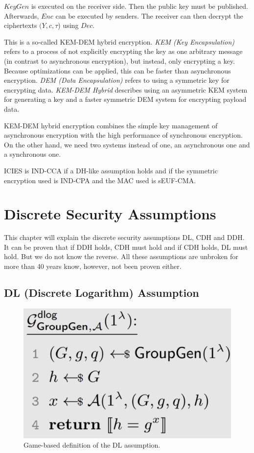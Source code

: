 $KeyGen$ is executed on the receiver side.
Then the public key must be published.
Afterwards, $Enc$ can be executed by senders.
The receiver can then decrypt the ciphertexts $(Y, c, \tau$) using $Dec$.

This is a so-called KEM-DEM hybrid encryption.
\textit{KEM (Key Encapsulation)} refers to a process of not explicitly encrypting the key as one arbitrary message (in contrast to asynchronous encryption), but instead, only encrypting a key. Because optimizations can be applied, this can be faster than asynchronous encryption.
\textit{DEM (Data Encapsulation)} refers to using a symmetric key for encrypting data.
\textit{KEM-DEM Hybrid} describes using an asymmetric KEM system for generating a key and a faster symmetric DEM system for encrypting payload data.

KEM-DEM hybrid encryption combines the simple key management of asynchronous encryption with the high performance of synchronous encryption.
On the other hand, we need two systems instead of one, an asynchronous one and a synchronous one.

ICIES is IND-CCA if a DH-like assumption holds and if the symmetric encryption used is IND-CPA and the MAC used is sEUF-CMA.

\section{Discrete Security Assumptions}

This chapter will explain the discrete security assumptions DL, CDH and DDH.
It can be proven that if DDH holds, CDH must hold and if CDH holds, DL must hold.
But we do not know the reverse.
All these assumptions are unbroken for more than 40 years know, however, not been proven either.

\subsection{DL (Discrete Logarithm) Assumption}

\begin{figure}
    \center
    \includegraphics[width=\linewidth]{gfx/discrete_log_assumption.png}
    \caption{Game-based definition of the DL assumption.}
    \label{fig:DL_assumption}
\end{figure}

